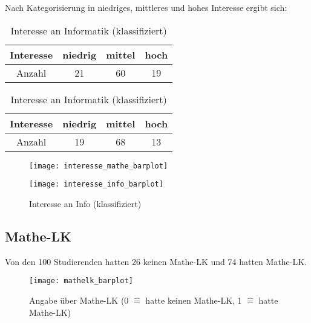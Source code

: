 \documentclass[paper=a4,                 %
               fontsize=12pt,            %
               parskip=half,             %
               ngerman,                 %
               ]{scrartcl}
\begin{document}
Nach Kategorisierung in niedriges, mittleres und hohes Interesse ergibt sich: 

\begin{table}[h]
\begin{minipage}[b]{.5\linewidth}
	\begin{center}
\begin{tabular}{c||c|c|c}
Interesse & niedrig & mittel & hoch \\
\hline
Anzahl & 21 & 60 & 19 \\
\end{tabular}
\end{center}
\caption{Interesse an Mathe \newline(klassifiziert)}
\end{minipage}
\begin{minipage}[b]{.5\linewidth}
\begin{center}
\begin{tabular}{c||c|c|c}
Interesse & niedrig & mittel & hoch \\
\hline
Anzahl & 19 & 68 & 13 \\
\end{tabular} 
\end{center}
\caption{Interesse an Informatik \newline(klassifiziert)}
\end{minipage}
\end{table}

\begin{figure}[h]
   \begin{minipage}[b]{.4\linewidth}
      \texttt{[image: interesse\_mathe\_barplot]}
      \caption{Interesse an Mathe (klassifiziert)}
   \end{minipage}
   \hspace{.1\linewidth}%
   \begin{minipage}[b]{.4\linewidth} %
	\texttt{[image: interesse\_info\_barplot]}
	\caption{Interesse an Info  (klassifiziert)}
   \end{minipage}
\end{figure}

\newpage
\subsection{Mathe-LK}
Von den 100 Studierenden hatten 26 keinen Mathe-LK und 74 hatten Mathe-LK.
\begin{figure}[h]
\begin{center}
\texttt{[image: mathelk\_barplot]}
\caption{Angabe über Mathe-LK (0 $\widehat{=}$ hatte keinen Mathe-LK, 1 $\widehat{=}$ hatte Mathe-LK)}
\end{center}
\end{figure}
\end{document}
